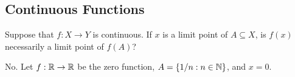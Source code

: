 





\subsection{Continuous Functions}

	\begin{exercise}
		Suppose that $f:X\to Y$ is continuous. If $x$ is a limit point of $A\subseteq X$, is $f(x)$ necessarily a limit point of $f(A)$?
	\end{exercise}
	\begin{solution*}
		No. Let $f:\mathbb{R}\to\mathbb{R}$ be the zero function, $A=\{1/n : n\in\mathbb{N}\}$, and $x=0$.
	\end{solution*}

